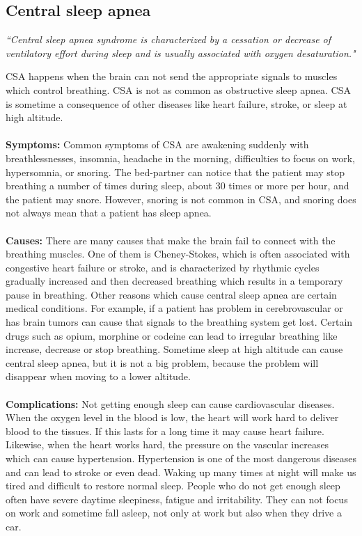 \subsection{Central sleep apnea}
    \textit{``Central sleep apnea syndrome is characterized by a cessation or decrease of ventilatory effort during sleep and is usually associated with oxygen desaturation."}\cite{Westchester}
    
    CSA happens when the brain can not send the appropriate signals to muscles which control breathing. CSA is not as common as obstructive sleep apnea. CSA is sometime a consequence of other diseases like heart failure, stroke, or sleep at high altitude.\\\\
    \textbf{Symptoms:} Common symptoms of CSA are awakening suddenly with breathlessnesses, insomnia, headache in the morning, difficulties to focus on work, hypersomnia, or snoring. The bed-partner can notice that the patient may stop breathing a number of times during sleep, about 30 times or more per hour, and the patient may snore. However, snoring is not common in CSA, and snoring does not always mean that a patient has sleep apnea.\\\\
    \textbf{Causes:} There are many causes that make the brain fail to connect with the breathing muscles. One of them is Cheney-Stokes, which is often associated with congestive heart failure or stroke, and is characterized by rhythmic cycles gradually increased and then decreased breathing which results in a temporary pause in breathing. 
    Other reasons which cause central sleep apnea are certain medical conditions. For example, if a patient has problem in cerebrovascular or has brain tumors can cause that signals to the breathing system get lost. Certain drugs such as opium, morphine or codeine can lead to irregular breathing like increase, decrease or stop breathing. Sometime sleep at high altitude can cause central sleep apnea, but it is not a big problem, because the problem will disappear when moving to a lower altitude.\\\\
    \textbf{Complications:} Not getting enough sleep can cause cardiovascular diseases. When the oxygen level in the blood is low, the heart will work hard to deliver blood to the tissues. If this lasts for a long time it may cause heart failure. Likewise, when the heart works hard, the pressure on the vascular increases which can cause hypertension. Hypertension is one of the most dangerous diseases and can lead to stroke or even dead. Waking up many times at night will make us tired and difficult to restore normal sleep. People who do not get enough sleep often have severe daytime sleepiness, fatigue and irritability. They can not focus on work and sometime fall asleep, not only at work but also when they drive a car.\\\\
